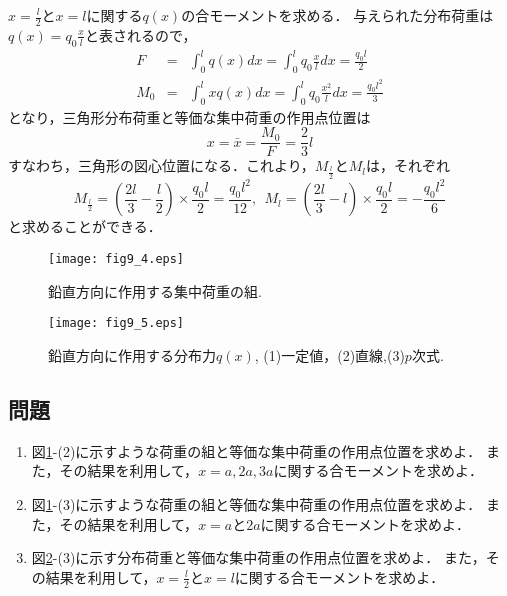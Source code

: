 \documentclass[10pt,a4j]{jarticle}
\begin{document}
\begin{enumerate}
$x=\frac{l}{2}$と$x=l$に関する$q(x)$の合モーメントを求める．
与えられた分布荷重は$q(x)=q_0\frac{x}{l}$と表されるので，
\begin{eqnarray}
	F&= & \int _0^l q(x)dx = \int_0^l q_0 \frac{x}{l}dx=\frac{q_0l}{2}
	\label{eqn:}
	\\
	M_0&= & \int _0^l xq(x)dx = \int_0^l q_0 \frac{x^2}{l}dx=\frac{q_0l^2}{3}
	\label{eqn:}
\end{eqnarray}
となり，三角形分布荷重と等価な集中荷重の作用点位置は
\begin{equation}
	x=\bar x = \frac{M_0}{F}=\frac{2}{3}l
	\label{eqn:xbar_tri}
\end{equation}
すなわち，三角形の図心位置になる．これより，$M_{\frac{l}{2}}$と$M_l$は，それぞれ
\begin{equation}
	M_{\frac{l}{2}}=\left(\frac{2l}{3}-\frac{l}{2}\right) \times \frac{q_0l}{2} =\frac{q_0l^2}{12}, \ \ 
	M_l = \left(\frac{2l}{3}-l \right) \times \frac{q_0l}{2} =-\frac{q_0l^2}{6}
	\label{eqn:}
\end{equation}
と求めることができる．
\end{enumerate}
\begin{figure}[h]
	\begin{center}
	\texttt{[image: fig9\_4.eps]} 
	\end{center}
	\caption{
		鉛直方向に作用する集中荷重の組.
	} 
	\label{fig:fig9_4}
\end{figure}
\begin{figure}[h]
	\begin{center}
	\texttt{[image: fig9\_5.eps]} 
	\end{center}
	\caption{
		鉛直方向に作用する分布力$q(x)$, (1)一定値，(2)直線,(3)$p$次式.
	} 
	\label{fig:fig9_5}
\end{figure}
\subsection{問題}
\begin{enumerate}
\item
	図\ref{fig:fig9_4}-(2)に示すような荷重の組と等価な集中荷重の作用点位置を求めよ．
	また，その結果を利用して，$x=a,2a,3a$に関する合モーメントを求めよ．
\item
	図\ref{fig:fig9_4}-(3)に示すような荷重の組と等価な集中荷重の作用点位置を求めよ．
	また，その結果を利用して，$x=a$と$2a$に関する合モーメントを求めよ．
\item
	図\ref{fig:fig9_5}-(3)に示す分布荷重と等価な集中荷重の作用点位置を求めよ．
		また，その結果を利用して，$x=\frac{l}{2}$と$x=l$に関する合モーメントを求めよ．
\end{enumerate}
\end{document}
